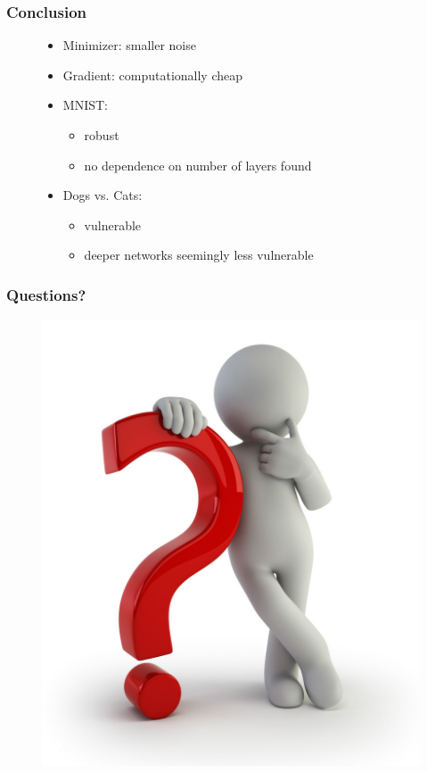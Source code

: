 \documentclass[handout]{beamer}
\begin{document}
\begin{frame}
\frametitle{Conclusion} 
\begin{figure}

\begin{itemize}
\item Minimizer: smaller noise
\item Gradient: computationally cheap
\end{itemize}
\hspace{2em}
\begin{itemize}
\item MNIST: 
\begin{itemize}
\item robust
\item no dependence on number of layers found
\end{itemize}
\item Dogs vs. Cats: 
\begin{itemize}
\item vulnerable
\item deeper networks seemingly less vulnerable
\end{itemize} 
\end{itemize}
\end{figure}
\end{frame}


\begin{frame}
\frametitle{Questions?} 
\begin{figure}
\includegraphics[width=0.55\linewidth]{pictures/question1.jpeg}
\end{figure}
\end{frame}
\end{document}
